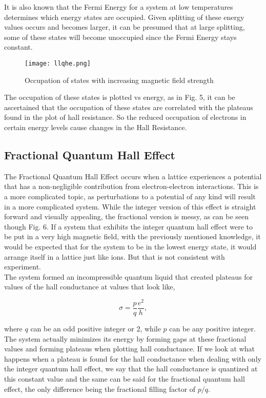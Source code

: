 \documentclass[14pt]{article}
\begin{document}
It is also known that the Fermi Energy for a system at low temperatures determines which energy states are occupied. Given splitting of these energy values occurs and becomes larger, it can be presumed that at large splitting, some of these states will become unoccupied since the Fermi Energy stays constant. \\

\begin{figure}[ht]
	\centering
	\texttt{[image: llqhe.png]}
	\label{fig:sheet4}
	\caption{Occupation of states with increasing magnetic field strength\cite{hee}}
\end{figure}

The occupation of these states is plotted vs energy, as in Fig. 5, it can be ascertained that the occupation of these states are correlated with the plateaus found in the plot of hall resistance. So the reduced occupation of electrons in certain energy levels cause changes in the Hall Resistance.

\subsection*{Fractional Quantum Hall Effect}

The Fractional Quantum Hall Effect occurs when a lattice experiences a potential that has a non-negligible contribution from electron-electron interactions. This is a more complicated topic, as perturbations to a potential of any kind will result in a more complicated system. While the integer version of this effect is straight forward and visually appealing, the fractional version is messy, as can be seen though Fig. 6. If a system that exhibits the integer quantum hall effect were to be put in a very high magnetic field, with the previously mentioned knowledge, it would be expected that for the system to be in the lowest energy state, it would arrange itself in a lattice just like ions. But that is not consistent with experiment.\\

The system formed an incompressible quantum liquid\cite{fqhe talk} that created plateaus for values of the hall conductance at values that look like,

\begin{equation*}
\sigma=\frac{p}{q}\frac{e^2}{h},
\end{equation*}

where $q$ can be an odd positive integer or 2, while $p$ can be any positive integer. The system actually minimizes its energy by forming gaps at these fractional values and forming plateaus when plotting hall conductance. If we look at what happens when a plateau is found for the hall conductance when dealing with only the integer quantum hall effect, we say that the hall conductance is quantized at this constant value and the same can be said for the fractional quantum hall effect, the only difference being the fractional filling factor of $p/q$.\cite{fqhe talk}\cite{fqhetransport}
\end{document}
